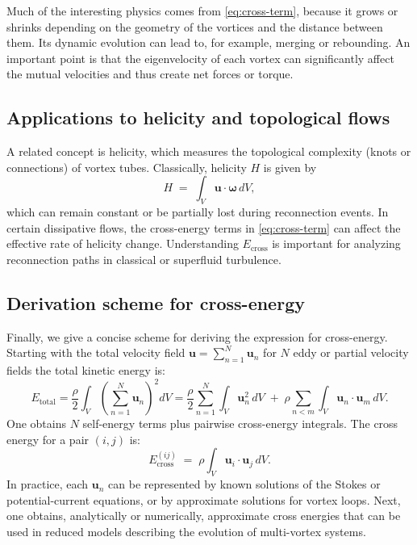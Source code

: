 \documentclass[preprint]{revtex4-2}
\begin{document}
Much of the interesting physics comes from \eqref{eq:cross-term}, because it
grows or shrinks depending on the geometry of the vortices and the distance between them.
Its dynamic evolution can lead to, for example, merging or rebounding. An important point is that
the eigenvelocity of each vortex can significantly affect the mutual velocities and thus
create net forces or torque.
\subsection{Applications to helicity and topological flows}
\label{sec:helicity}
A related concept is helicity, which measures the topological complexity (knots or
connections) of vortex tubes. Classically, helicity $H$ is given by
\begin{equation}
   H \;=\; \int_V \mathbf{u} \cdot \boldsymbol{\omega}\, dV,\label{eq:appendix:helicity}
\end{equation}
which can remain constant or be partially lost during reconnection events. In certain
dissipative flows, the cross-energy terms in \eqref{eq:cross-term} can affect the effective rate of helicity change. Understanding $E_\text{cross}$ is important
for analyzing reconnection paths in classical or superfluid turbulence.

\subsection{Derivation scheme for cross-energy}
\label{sec:derivation}
Finally, we give a concise scheme for deriving the expression for cross-energy. Starting with the total velocity field $\mathbf{u} = \sum_{n=1}^N \mathbf{u}_n$
for $N$ eddy or partial velocity fields the total kinetic energy is:
\begin{equation}
   E_\text{total}
   = \frac{\rho}{2} \int_V \left(\sum_{n=1}^N \mathbf{u}_n \right)^2 dV
   = \frac{\rho}{2} \sum_{n=1}^N \int_V \mathbf{u}_n^2 \, dV
   \;+\;\rho \sum_{n<m} \int_V \mathbf{u}_n \cdot \mathbf{u}_m \, dV.\label{eq:appendix:total-energy-derivation}
\end{equation}
One obtains $N$ self-energy terms plus pairwise cross-energy integrals.
The cross energy for a pair $(i,j)$ is:
\begin{equation}
   E_\text{cross}^{(ij)} \;=\; \rho \int_V \mathbf{u}_i \cdot \mathbf{u}_j \, dV.\label{eq:appendix:cross-energy-derivation}
\end{equation}
In practice, each $\mathbf{u}_n$ can be represented by known solutions of the Stokes or potential-current equations, or by approximate solutions for vortex loops. Next, one obtains, analytically or numerically, approximate cross energies
that can be used in reduced models describing the evolution of multi-vortex systems.
\end{document}
